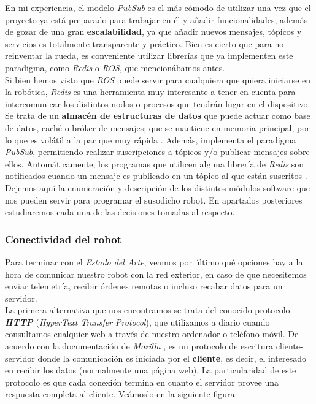 En mi experiencia, el modelo \textit{PubSub} es el más cómodo de utilizar una vez que el proyecto ya está preparado para trabajar en él y añadir funcionalidades, además de gozar de una gran \textbf{escalabilidad}, ya que añadir nuevos mensajes, tópicos y servicios es totalmente transparente y práctico. Bien es cierto que para no reinventar la rueda, es conveniente utilizar librerías que ya implementen este paradigma, como \textit{Redis} o \textit{ROS}, que mencionábamos antes.\\

Si bien hemos visto que \textit{ROS} puede servir para cualquiera que quiera iniciarse en la robótica, \textit{Redis} es una herramienta muy interesante a tener en cuenta para intercomunicar los distintos nodos o procesos que tendrán lugar en el dispositivo. Se trata de un \textbf{almacén de estructuras de datos} que puede actuar como base de datos, caché o bróker de mensajes; que se mantiene en memoria principal, por lo que es volátil a la par que muy rápida \cite{redis}. Además, implementa el paradigma \textit{PubSub}, permitiendo realizar suscripciones a tópicos y/o publicar mensajes sobre ellos. Automáticamente, los programas que utilicen alguna librería de \textit{Redis} son notificados cuando un mensaje es publicado en un tópico al que están suscritos \cite{redis-pubsub}.\\

Dejemos aquí la enumeración y descripción de los distintos módulos software que nos pueden servir para programar el susodicho robot. En apartados posteriores estudiaremos cada una de las decisiones tomadas al respecto.\\


\subsubsection{Conectividad del robot}

Para terminar con el \textit{Estado del Arte}, veamos por último qué opciones hay a la hora de comunicar nuestro robot con la red exterior, en caso de que necesitemos enviar telemetría, recibir órdenes remotas o incluso recabar datos para un servidor.\\

La primera alternativa que nos encontramos se trata del conocido protocolo \textbf{\textit{HTTP}} (\textit{HyperText Transfer Protocol}), que utilizamos a diario cuando consultamos cualquier web a través de nuestro ordenador o teléfono móvil. De acuerdo con la documentación de \textit{Mozilla} \cite{http_protocol}, es un protocolo de escritura cliente-servidor donde la comunicación es iniciada por el \textbf{cliente}, es decir, el interesado en recibir los datos (normalmente una página web). La particularidad de este protocolo es que cada conexión termina en cuanto el servidor provee una respuesta completa al cliente. Veámoslo en la siguiente figura:

